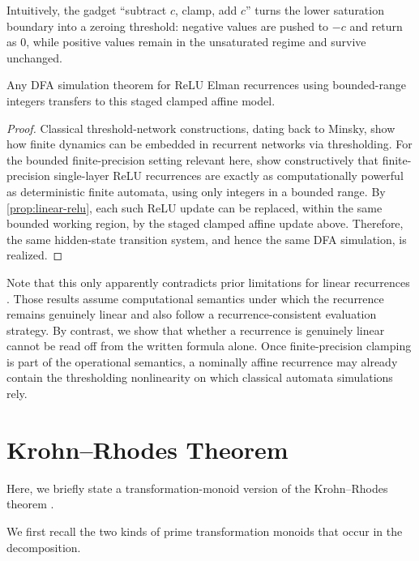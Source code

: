 \documentclass{article}
\begin{document}
Intuitively, the gadget ``subtract $c$, clamp, add $c$'' turns the lower saturation boundary into a zeroing threshold: negative values are pushed to $-c$ and return as $0$, while positive values remain in the unsaturated regime and survive unchanged.

\begin{corollary}
Any DFA simulation theorem for ReLU Elman recurrences using bounded-range integers transfers to this staged clamped affine model.
\end{corollary}
\begin{proof}
Classical threshold-network constructions, dating back to Minsky, show how finite dynamics can be embedded in recurrent networks via thresholding. 
For the bounded finite-precision setting relevant here, \citet{korsky2019computationalpowerrnns} show constructively that finite-precision single-layer ReLU recurrences are exactly as computationally powerful as deterministic finite automata, using only integers in a bounded range. 
By \cref{prop:linear-relu}, each such ReLU update can be replaced, within the same bounded working region, by the staged clamped affine update above. Therefore, the same hidden-state transition system, and hence the same DFA simulation, is realized. 
\end{proof}
Note that this only apparently contradicts prior limitations for linear recurrences \citep[e.g.,][Theorem 4.2]{merrill2024illusion}. Those results assume computational semantics under which the recurrence remains genuinely linear and also follow a recurrence-consistent evaluation strategy. By contrast, we show that whether a recurrence is genuinely linear cannot be read off from the written formula alone. Once finite-precision clamping is part of the operational semantics, a nominally affine recurrence may already contain the thresholding nonlinearity on which classical automata simulations rely.

\section{Krohn--Rhodes Theorem}\label{app:kr}

Here, we briefly state a transformation-monoid version of the Krohn--Rhodes theorem
\citep{krohn-rhodes-1965-algebraic}.

We first recall the two kinds of prime transformation monoids that occur in the
decomposition.
\end{document}
